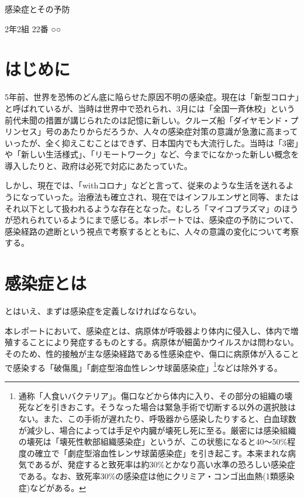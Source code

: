 \documentclass{ltjsarticle}
\begin{document}
\begin{center}
    \Large{感染症とその予防}
\end{center}
\begin{flushright}
    2年2組 22番 ○○
\end{flushright}

\section{はじめに}

5年前、世界を恐怖のどん底に陥らせた原因不明の感染症。現在は「新型コロナ」と呼ばれているが、当時は世界中で恐れられ、3月には「全国一斉休校」という前代未聞の措置が講じられたのは記憶に新しい。クルーズ船「ダイヤモンド・プリンセス」号のあたりからだろうか、人々の感染症対策の意識が急激に高まっていったが、全く抑えこむことはできず、日本国内でも大流行した。当時は「3密」や「新しい生活様式」、「リモートワーク」など、今までになかった新しい概念を導入したりと、政府は必死で対応にあたっていた。

しかし、現在では、「withコロナ」などと言って、従来のような生活を送れるようになっていった。治療法も確立され、現在ではインフルエンザと同等、またはそれ以下として扱われるような存在となった。むしろ「マイコプラズマ」のほうが恐れられているようにまで感じる。本レポートでは、感染症の予防について、感染経路の遮断という視点で考察するとともに、人々の意識の変化について考察する。

\section{感染症とは}

とはいえ、まずは感染症を定義しなければならない。

本レポートにおいて、感染症とは、病原体が呼吸器より体内に侵入し、体内で増殖することにより発症するものとする。病原体が細菌かウイルスかは問わない。\\
そのため、性的接触が主な感染経路である性感染症や、傷口に病原体が入ることで感染する「破傷風」「劇症型溶血性レンサ球菌感染症」\footnote[1]{通称「人食いバクテリア」。傷口などから体内に入り、その部分の組織の壊死などを引きおこす。そうなった場合は緊急手術で切断する以外の選択肢はない。また、この手術が遅れたり、呼吸器から感染したりすると、白血球数が減少し、場合によっては手足や内臓が壊死し死に至る。厳密には感染組織の壊死は「壊死性軟部組織感染症」というが、この状態になると40〜50\%程度の確立で「劇症型溶血性レンサ球菌感染症」を引き起こす。本来まれな病気であるが、発症すると致死率は約30\%とかなり高い水準の恐ろしい感染症である。なお、致死率30\%の感染症は他にクリミア・コンゴ出血熱(1類感染症)などがある。}などは除外する。
\end{document}
